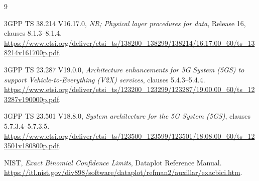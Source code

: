 \documentclass[11pt,a4paper]{article}
\begin{document}
\begin{thebibliography}{9}

3GPP TS 38.214 V16.17.0, \emph{NR; Physical layer procedures for data},
Release 16, clauses 8.1.3--8.1.4.
\url{https://www.etsi.org/deliver/etsi_ts/138200_138299/138214/16.17.00_60/ts_138214v161700p.pdf}.

3GPP TS 23.287 V19.0.0, \emph{Architecture enhancements for 5G System (5GS)
to support Vehicle-to-Everything (V2X) services}, clauses 5.4.3--5.4.4.
\url{https://www.etsi.org/deliver/etsi_ts/123200_123299/123287/19.00.00_60/ts_123287v190000p.pdf}.

3GPP TS 23.501 V18.8.0, \emph{System architecture for the 5G System (5GS)},
clauses 5.7.3.4--5.7.3.5.
\url{https://www.etsi.org/deliver/etsi_ts/123500_123599/123501/18.08.00_60/ts_123501v180800p.pdf}.

NIST, \emph{Exact Binomial Confidence Limits}, Dataplot Reference Manual.
\url{https://itl.nist.gov/div898/software/dataplot/refman2/auxillar/exacbici.htm}.

\end{thebibliography}
\end{document}
